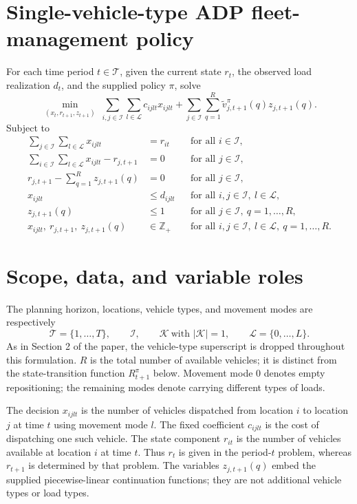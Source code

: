 \documentclass{article}
\begin{document}
\section*{Single-vehicle-type ADP fleet-management policy}

For each time period $t\in\mathcal T$, given the current state $r_t$, the observed load realization $d_t$, and the supplied policy $\pi$, solve
\begin{equation}
\min_{(x_t,r_{t+1},z_{t+1})}\;
\sum_{i,j\in\mathcal I}\sum_{l\in\mathcal L}c_{ijlt}x_{ijlt}
+\sum_{j\in\mathcal I}\sum_{q=1}^{R}\tilde v^\pi_{j,t+1}(q)z_{j,t+1}(q).
\tag{11}
\end{equation}
Subject to
\begin{align}
\sum_{j\in\mathcal I}\sum_{l\in\mathcal L}x_{ijlt}
&=r_{it} &&\text{for all }i\in\mathcal I,\tag{12}\\
\sum_{i\in\mathcal I}\sum_{l\in\mathcal L}x_{ijlt}-r_{j,t+1}
&=0 &&\text{for all }j\in\mathcal I,\tag{13}\\
r_{j,t+1}-\sum_{q=1}^{R}z_{j,t+1}(q)
&=0 &&\text{for all }j\in\mathcal I,\tag{14}\\
x_{ijlt}&\leq d_{ijlt} &&\text{for all }i,j\in\mathcal I,\ l\in\mathcal L,\tag{15}\\
z_{j,t+1}(q)&\leq 1 &&\text{for all }j\in\mathcal I,\ q=1,\ldots,R,\tag{16}\\
x_{ijlt},\ r_{j,t+1},\ z_{j,t+1}(q)&\in\mathbb Z_+
&&\text{for all }i,j\in\mathcal I,\ l\in\mathcal L,\ q=1,\ldots,R.
\tag{17}
\end{align}

\section*{Scope, data, and variable roles}

The planning horizon, locations, vehicle types, and movement modes are respectively
\[
\mathcal T=\{1,\ldots,T\},\qquad
\mathcal I,\qquad
\mathcal K\ \text{with }|\mathcal K|=1,\qquad
\mathcal L=\{0,\ldots,L\}.
\]
As in Section 2 of the paper, the vehicle-type superscript is dropped throughout this formulation. $R$ is the total number of available vehicles; it is distinct from the state-transition function $R^\pi_{t+1}$ below. Movement mode $0$ denotes empty repositioning; the remaining modes denote carrying different types of loads.

The decision $x_{ijlt}$ is the number of vehicles dispatched from location $i$ to location $j$ at time $t$ using movement mode $l$. The fixed coefficient $c_{ijlt}$ is the cost of dispatching one such vehicle. The state component $r_{it}$ is the number of vehicles available at location $i$ at time $t$. Thus $r_t$ is given in the period-$t$ problem, whereas $r_{t+1}$ is determined by that problem. The variables $z_{j,t+1}(q)$ embed the supplied piecewise-linear continuation functions; they are not additional vehicle types or load types.
\end{document}
